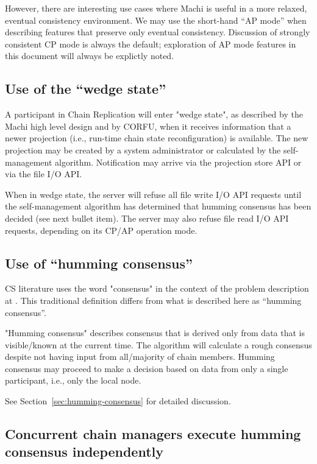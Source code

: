 \documentclass[preprint,10pt]{sigplanconf}
\begin{document}
However, there are interesting use cases where Machi is useful in a
more relaxed, eventual consistency environment.  We may use the
short-hand ``AP mode'' when describing features that preserve only
eventual consistency.  Discussion of strongly consistent CP
mode is always the default; exploration of AP mode features in this document
will always be explictly noted.

\subsection{Use of the ``wedge state''}

A participant in Chain Replication will enter "wedge state", as
described by the Machi high level design \cite{machi-design} and by CORFU,
when it receives information that
a newer projection (i.e., run-time chain state reconfiguration) is
available.  The new projection may be created by a system
administrator or calculated by the self-management algorithm.
Notification may arrive via the projection store API or via the file
I/O API.

When in wedge state, the server will refuse all file write I/O API
requests until the self-management algorithm has determined that
humming consensus has been decided (see next bullet item).  The server
may also refuse file read I/O API requests, depending on its CP/AP
operation mode.

\subsection{Use of ``humming consensus''}

CS literature uses the word "consensus" in the context of the problem
description at \cite{wikipedia-consensus}
.
This traditional definition differs from what is described here as
``humming consensus''.

"Humming consensus" describes
consensus that is derived only from data that is visible/known at the current
time.
The algorithm will calculate
a rough consensus despite not having input from all/majority
of chain members.  Humming consensus may proceed to make a
decision based on data from only a single participant, i.e., only the local
node.

See Section~\ref{sec:humming-consensus} for detailed discussion.

\subsection{Concurrent chain managers execute humming consensus independently}
\end{document}
